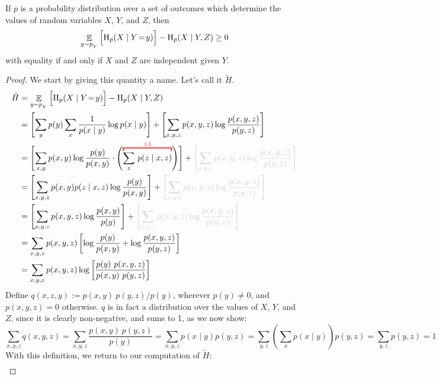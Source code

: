 \documentclass{article}
\begin{document}
\begin{lemma} \label{lem:bnmaxent-component}
	If $p$ is a probability distribution over a set of outcomes which determine the values of random variables $X$, $Y$, and $Z$, then 
	\[ \mathop{\mathbb E}_{y \sim p_{_{Y}}} \Big[ \mathrm{H}_p(X \mid Y \!=\!y) \Big]  - \mathrm{H}_p( X \mid Y, Z) \geq 0 \]
	with equality if and only if $X$ and $Z$ are independent given $Y$.
\end{lemma}
\begin{proof}
	We start by giving this quantity a name. Let's call it $\tilde H$.
	\begin{align*}
		\tilde H &= \E_{y \sim p_{_{Y}}}  \Big[ \H_p(X \mid Y \!=\!y)\Big] - \H_p( X \mid Y, Z)  \\
			&=  \left[\sum_{y} p(y) \sum_x \frac{1}{p(x \mid y)} \log p(x\mid y) \right]+ \left[\sum_{x,y, z} p(x, y, z) \log \frac{p(x,y,z)}{p(y, z)}\right] \\[0.5em]
		&= \left[\sum_{x,y} p(x,y) \log \frac{p(y)}{p(x,y)} \cdot 
				\left( {\color{red} \vphantom{\sum_{z}}\smash{\overbracket{\color{black}{\sum_{z}}~p(z \mid x, z)}^{=1}}}\right)
			\right] + {\color{inactive}\left[\sum_{x,y, z} p(x, y, z) \log \frac{p(x,y,z)}{p(y, z)} \right]} \\
		&= \left[\sum_{x,y, z} p(x,y) p(z \mid x, z) \log \frac{p(y)}{p(x,y)} \right] + {\color{inactive}\left[\sum_{x,y, z} p(x, y, z) \log \frac{p(x,y,z)}{p(y, z)} \right]} \\
		&= \left[\sum_{x,y, z} p(x,y ,z) \log \frac{p(x,y)}{p(y)}
			\right] + {\color{inactive}\left[\sum_{x,y, z} p(x, y, z) \log \frac{p(x,y,z)}{p(y, z)} \right]} \\
		&= \sum_{x,y, z} p(x,y ,z) \left[ \log \frac{p(y)}{p(x,y)} + \log \frac{p(x,y,z)}{p(y, z)} \right] \\
		&= \sum_{x,y, z}  p(x,y ,z) \log \left[\frac{p(y)\ p(x,y,z)}{p(x,y)\ p(y,z)} \right]  \\
	\end{align*}
	Define $q(x,z,y) := {p(x,y)\ p(y,z) }/{p(y)}$, wherever $p(y)\neq 0$, and $p(x,y,z) = 0$ otherwise. $q$ is in fact a distribution over the values of $X$, $Y$, and $Z$, since it 
	is clearly non-negative, and sums to 1, as we now show:
	\[
	 \sum_{x,y,z} q(x,y, z) = \sum_{x,y,z} \frac{p(x,y)\ p(y,z)}{p(y)}
		= \sum_{x,y,z} p(x \mid y) p(y,z)
		= \sum_{y,z} \left(\sum_x p(x \mid y)\right) p(y,z)
		= \sum_{y,z}  p(y,z)
		= 1
	\]	
		With this definition, we return to our computation of $\tilde H$:
	\begin{align*}

\end{align*}
\end{proof}
\end{document}
